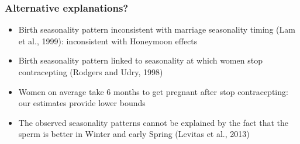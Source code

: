 \documentclass[10pt,letterpaper,subeqn]{beamer}
\begin{document}



\begin{frame}
\frametitle{Alternative explanations?}
\begin{itemize}
\item Birth seasonality pattern inconsistent with marriage seasonality timing (Lam et al., 1999): inconsistent with Honeymoon effects
\item Birth seasonality pattern linked to seasonality at which women stop contracepting (Rodgers and Udry,  1998)
\item Women on average take 6 months to get pregnant after stop contracepting: our estimates provide lower bounds
\item The observed seasonality patterns cannot be explained by the fact that the sperm is better in Winter and early Spring (Levitas et al., 2013)
\end{itemize}
\end{frame}
\end{document}
